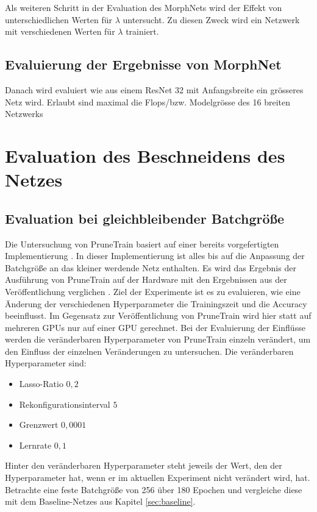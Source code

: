 Als weiteren Schritt in der Evaluation des MorphNets wird der Effekt von unterschiedlichen Werten für $\lambda$ untersucht. Zu diesen Zweck wird ein Netzwerk mit verschiedenen Werten für $\lambda$ trainiert.   



\section{Evaluierung der Ergebnisse von MorphNet}


Danach wird evaluiert wie aus einem ResNet 32 mit Anfangsbreite ein grösseres Netz wird. Erlaubt sind maximal die Flops/bzw. Modelgrösse des 16 breiten Netzwerks






\color{black}





\chapter{Evaluation des Beschneidens des Netzes}\label{sec:ptexperimente}
\section{Evaluation bei gleichbleibender Batchgröße}
Die Untersuchung von PruneTrain basiert auf einer bereits vorgefertigten Implementierung \cite{ptImpl}. In dieser Implementierung ist alles bis auf die Anpassung der Batchgröße an das kleiner werdende Netz enthalten. Es wird das Ergebnis der Ausführung von PruneTrain auf der Hardware mit den Ergebnissen aus der Veröffentlichung verglichen \cite{prunetrain}. Ziel der Experimente ist es zu evaluieren, wie eine Änderung der verschiedenen Hyperparameter die Trainingszeit und die Accuracy beeinflusst. Im Gegensatz zur Veröffentlichung von PruneTrain wird hier statt auf mehreren GPUs nur auf einer GPU gerechnet. Bei der Evaluierung der Einflüsse werden die veränderbaren Hyperparameter von PruneTrain einzeln verändert, um den Einfluss der einzelnen Veränderungen zu untersuchen.  
Die veränderbaren Hyperparameter sind:
\begin{itemize}
 \item Lasso-Ratio $0,2$
 \item Rekonfigurationsinterval $5$
 \item Grenzwert $0,0001$
 \item Lernrate $0,1$
\end{itemize}
Hinter den veränderbaren Hyperparameter steht jeweils der Wert, den der Hyperparameter hat, wenn er im aktuellen Experiment nicht verändert wird, hat.
Betrachte eine feste Batchgröße von 256 über 180 Epochen und vergleiche diese mit dem Baseline-Netzes aus Kapitel \ref{sec:baseline}. 


